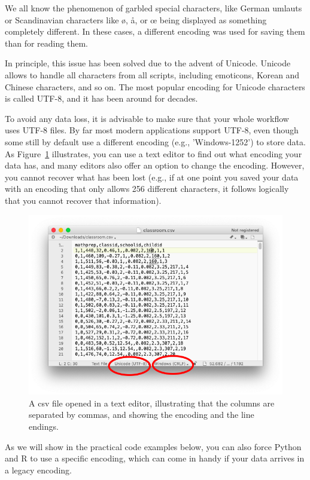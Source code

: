 We all know the phenomenon of garbled special characters, like German umlauts or Scandinavian characters like ø, å, or œ being displayed as something completely different. In these cases, a different encoding was used for saving them than for reading them.

In principle, this issue has been solved due to the advent of Unicode. Unicode allows to handle all characters from all scripts, including emoticons, Korean and Chinese characters, and so on. The most popular encoding for Unicode characters is called UTF-8, and it has been around for decades. 

To avoid any data loss, it is advisable to make sure that your whole workflow uses UTF-8 files. By far most modern applications support UTF-8, even though some still by default use a different encoding (e.g., 'Windows-1252') to store data. As Figure~\ref{fig:csv-in-editor} illustrates, you can use a text editor to find out what encoding your data has, and many editors also offer an option to change the encoding. However, you cannot recover what has been lost (e.g., if at one point you saved your data with an encoding that only allows 256 different characters, it follows logically that you cannot recover that information).


\begin{figure}
\centering
\includegraphics[width=0.9\linewidth]{figures/ch6_csv-in-editor}
\caption{A csv file opened in a text editor, illustrating that the columns are separated by commas, and showing the encoding and the line endings.}
\label{fig:csv-in-editor}
\end{figure}

As we will show in the practical code examples below, you can also force Python and R to use a specific encoding, which can come in handy if your data arrives in a legacy encoding.

